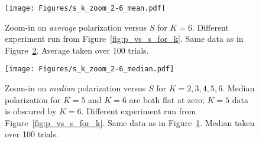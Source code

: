 

\begin{figure}[t!]
  \centering
    \texttt{[image: Figures/s\_k\_zoom\_2-6\_mean.pdf]}
  \caption{Zoom-in on \emph{average} polarization versus $S$ for $K=6$. 
  Different experiment run from Figure~\ref{fig:p_vs_s_for_k}. 
  Same data as in Figure~\ref{fig:zoom_median}.
  Average taken over 100 trials.}
  \label{fig:zoom_average}
\end{figure}

\begin{figure}[h!]
  \centering
    \texttt{[image: Figures/s\_k\_zoom\_2-6\_median.pdf]}
  \caption{Zoom-in on \emph{median} polarization versus $S$ for $K=2,3,4,5,6$. 
    Median polarization for $K=5$ and $K=6$ are both flat at zero; $K=5$ 
    data is obscured by $K=6$.
    Different experiment run from Figure~\ref{fig:p_vs_s_for_k}.
    Same data as in Figure~\ref{fig:zoom_average}.
    Median taken over 100 trials.
  }
  \label{fig:zoom_median}
\end{figure}


